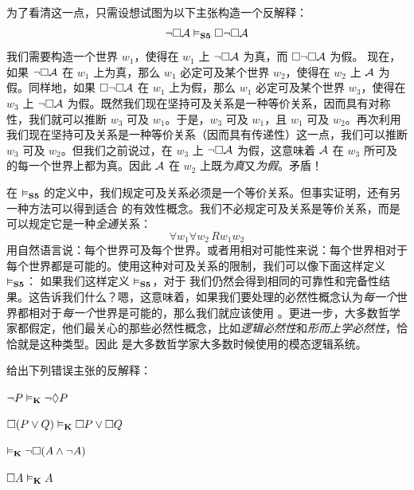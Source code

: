 为了看清这一点，只需设想试图为以下主张构造一个反解释：
\[
	\neg\Box\mathcal{A} \vDash_{\mathbf{S5}}  \Box \neg\Box \mathcal{A}
\]
我们需要构造一个世界 $w_1$，使得在 $w_1$ 上 $\neg\Box\mathcal{A}$ 为真，而 $\Box \neg\Box \mathcal{A}$ 为假。
现在，如果 $\neg\Box\mathcal{A}$ 在 $w_1$ 上为真，那么 $w_1$ 必定可及某个世界 $w_2$，使得在 $w_2$ 上 $\mathcal{A}$ 为假。同样地，如果 $\Box \neg\Box \mathcal{A}$ 在 $w_1$ 上为假，那么 $w_1$ 必定可及某个世界 $w_3$，使得在 $w_3$ 上 $\neg\Box \mathcal{A}$ 为假。既然我们现在坚持可及关系是一种等价关系，因而具有对称性，我们就可以推断 $w_3$ 可及 $w_1$。于是，$w_3$ 可及 $w_1$，且 $w_1$ 可及 $w_2$。再次利用我们现在坚持可及关系是一种等价关系（因而具有传递性）这一点，我们可以推断 $w_3$ 可及 $w_2$。但我们之前说过，在 $w_3$ 上 $\neg\Box \mathcal{A}$ 为假，这意味着 $\mathcal{A}$ 在 $w_3$ 所可及的每一个世界上都为真。因此 $\mathcal{A}$ 在 $w_2$ 上既\emph{为真}又\emph{为假}。矛盾！

在 $\vDash_{\mathbf{S5}} $ 的定义中，我们规定可及关系必须是一个等价关系。但事实证明，还有另一种方法可以得到适合 \mlSfive 的有效性概念。我们不必规定可及关系是等价关系，而是可以规定它是一种\emph{全通}关系：
\[\forall w_1\forall w_2\, Rw_1w_2\]
用自然语言说：每个世界可及每个世界。或者用相对可能性来说：每个世界相对于每个世界都是可能的。使用这种对可及关系的限制，我们可以像下面这样定义 $\vDash_{\mathbf{S5}} $：
如果我们这样定义 $\vDash_{\mathbf{S5}} $，对于 \mlSfive 我们仍然会得到相同的可靠性和完备性结果。这告诉我们什么？嗯，这意味着，如果我们要处理的必然性概念认为\emph{每一个}世界都相对于\emph{每一个}世界是可能的，那么我们就应该使用 \mlSfive。更进一步，大多数哲学家都假定，他们最关心的那些必然性概念，比如\emph{逻辑必然性}和\emph{形而上学必然性}，恰恰就是这种类型。因此 \mlSfive{} 是大多数哲学家大多数时候使用的模态逻辑系统。

\practiceproblems

\problempart
给出下列错误主张的反解释：


\begin{compactlist}
	\item $\neg P \vDash_{\mathbf{K}} \neg\Diamond P$
	\item $\Box(P \vee Q)\vDash_{\mathbf{K}} \Box P \vee \Box Q$
	\item $\vDash_{\mathbf{K}} \neg \Box (A\wedge \neg A)$
	\item $\Box A\vDash_{\mathbf{K}} A$
\end{compactlist}

